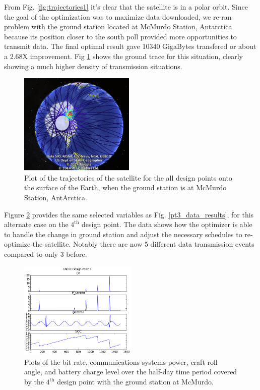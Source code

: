 \documentclass[]{aiaa-tc} %
\begin{document}
       

        From Fig. \ref{fig:trajectories1} it's clear that the satellite is in a polar orbit. Since the
        goal of the optimization was to maximize data downloaded, we re-ran problem with the ground 
        station located at McMurdo Station, Antarctica because its position closer to the south poll 
        provided more opportunities to transmit data. The final optimal result gave 10340 GigaBytes
        transfered or about a 2.68X improvement. Fig \ref{fig:trajectories2} shows the ground trace 
        for this situation, clearly showing a much higher density of transmission situations. 

        \begin{figure}[!htb]
            \centering
            \includegraphics[width=0.49\textwidth]{images/allpts_gearth_mcmurdo}
            \caption{Plot of the trajectories of the satellite
            for the all design points onto the surface of the Earth, when the ground 
            station is at McMurdo Station, AntArctica. 
            \label{fig:trajectories2}
            }
        \end{figure}

        Figure \ref{fig:pt3_results_mcmurdo} provides the same selected variables as Fig. \ref{pt3_data_results}, 
        for this alternate case on the $4^{\textrm{th}}$ design point. The data shows how the optimizer is 
        able to handle the change in ground station and adjust the necessary schedules to re-optimize the 
        satellite. Notably there are now 5 different data transmission events compared to only 3 before. 


        \begin{figure}[!htbp]
            \centering
            \includegraphics[width=0.5\textwidth]{images/cadre_results_mcmurdo}
            \caption{Plots of the bit rate, communications systems power, craft roll angle,
        and battery charge level over the half-day time period covered by the $4^{\textrm{th}}$ design point 
        with the ground station at McMurdo. }
            \label{fig:pt3_results_mcmurdo}
        \end{figure}
\end{document}
